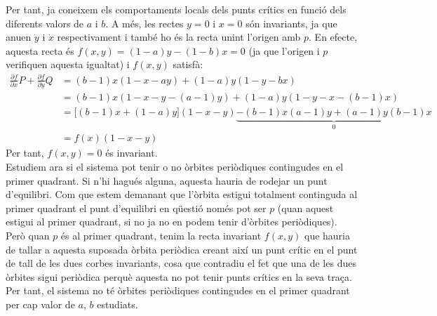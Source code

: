 \documentclass{article}
\begin{document}
Per tant, ja coneixem els comportaments locals dels punts crítics en funció dels diferents valors de $a$ i $b$. A més, les rectes $y=0$ i $x=0$ són invariants, ja que anu\lgem en $\dot{y}$ i $\dot{x}$ respectivament i també ho és la recta unint l'origen amb $p$. En efecte, aquesta recta és $f(x,y)=(1-a)y-(1-b)x=0$ (ja que l'origen i $p$ verifiquen aquesta igualtat) i $f(x,y)$ satisfà:
\begin{equation*}
  \begin{split}
    \frac{\partial f}{\partial x}P+\frac{\partial f}{\partial y}Q&=(b-1)x(1-x-ay)+(1-a)y(1-y-bx)\\
    &=(b-1)x\left(1-x-y-(a-1)y\right)+(1-a)y\left(1-y-x-(b-1)x\right)\\
    &=\big[(b-1)x+(1-a)y\big](1-x-y)\underbrace{-(b-1)x(a-1)y+(a-1)y(b-1)x}_{0}\\
    &=f(x)(1-x-y)
  \end{split}
\end{equation*}
Per tant, $f(x,y)=0$ és invariant. \\
Estudiem ara si el sistema pot tenir o no òrbites periòdiques contingudes en el primer quadrant. Si n'hi hagués alguna, aquesta hauria de rodejar un punt d'equilibri. Com que estem demanant que l'òrbita estigui totalment continguda al primer quadrant el punt d'equilibri en qüestió només pot ser $p$ (quan aquest estigui al primer quadrant, si no ja no en podem tenir d'òrbites periòdiques). Però quan $p$ és al primer quadrant, tenim la recta invariant $f(x,y)$ que hauria de tallar a aquesta suposada òrbita periòdica creant així un punt crític en el punt de tall de les dues corbes invariants, cosa que contradiu el fet que una de les dues òrbites sigui periòdica perquè aquesta no pot tenir punts crítics en la seva traça. Per tant, el sistema no té òrbites periòdiques contingudes en el primer quadrant per cap valor de $a$, $b$ estudiats.\\
\end{document}
